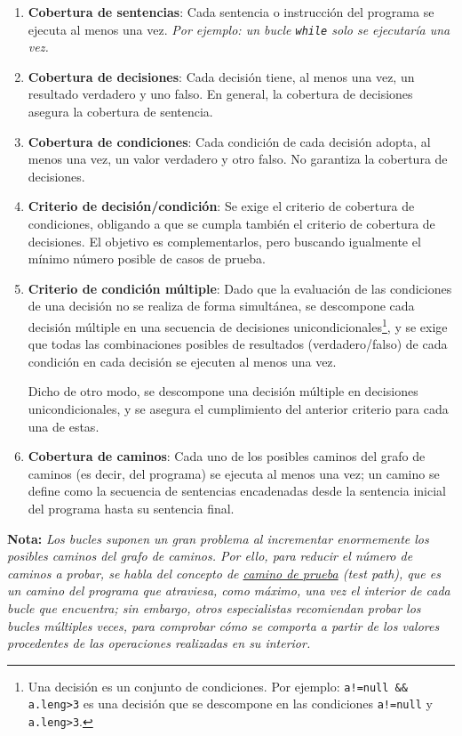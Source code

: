 \begin{enumerate}
    \item \textbf{Cobertura de sentencias}: Cada sentencia o instrucción del programa se ejecuta al menos una vez. \textit{Por ejemplo: un bucle \texttt{while} solo se ejecutaría una vez.}

    \item \textbf{Cobertura de decisiones}: Cada decisión tiene, al menos una vez, un resultado verdadero y uno falso. En general, la cobertura de decisiones asegura la cobertura de sentencia.

    \item \textbf{Cobertura de condiciones}: Cada condición de cada decisión adopta, al menos una vez, un valor verdadero y otro falso. No garantiza la cobertura de decisiones.

    \item \textbf{Criterio de decisión/condición}: Se exige el criterio de cobertura de condiciones, obligando a que se cumpla también el criterio de cobertura de decisiones. El objetivo es complementarlos, pero buscando igualmente el mínimo número posible de casos de prueba.

    \item \textbf{Criterio de condición múltiple}: Dado que la evaluación de las condiciones de una decisión no se realiza de forma simultánea, se descompone cada decisión múltiple en una secuencia de decisiones unicondicionales\footnote{Una decisión es un conjunto de condiciones. Por ejemplo:
              \texttt{a!=null \&\& a.leng>3} es una decisión que se descompone en las condiciones \texttt{a!=null} y \texttt{a.leng>3}.}, y se exige que todas las combinaciones posibles de resultados (verdadero/falso) de cada condición en cada decisión se ejecuten al menos una vez.

              Dicho de otro modo, se descompone una decisión múltiple en decisiones unicondicionales, y se asegura el cumplimiento del anterior criterio para cada una de estas.

    \item \textbf{Cobertura de caminos}: Cada uno de los posibles caminos del grafo de caminos (es decir, del programa) se ejecuta al menos una vez; un camino se define como la secuencia de sentencias encadenadas desde la sentencia inicial del programa hasta su sentencia final.
\end{enumerate}

\textbf{Nota:} \textit{Los bucles suponen un gran problema al incrementar enormemente los posibles caminos del grafo de caminos. Por ello, para reducir el número de caminos a probar, se habla del concepto de \uline{camino de prueba} (test path), que es un camino del programa que atraviesa, como máximo, una vez el interior de cada bucle que encuentra; sin embargo, otros especialistas recomiendan probar los bucles múltiples veces, para comprobar cómo se comporta a partir de los valores procedentes de las operaciones realizadas en su interior.}

